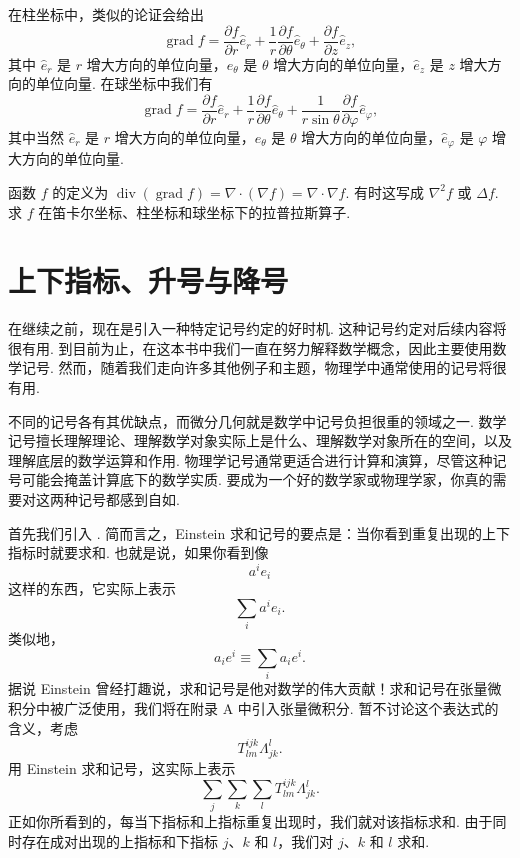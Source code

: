 在柱坐标中，类似的论证会给出
\[
\operatorname{grad}f=\frac{\partial f}{\partial r}\hat{e}_r+\frac{1}{r}\frac{\partial f}{\partial\theta}\hat{e}_\theta+\frac{\partial f}{\partial z}\hat{e}_z,
\]
其中 $\hat{e}_r$ 是 $r$ 增大方向的单位向量，$\hat{e}_\theta$ 是 $\theta$ 增大方向的单位向量，$\hat{e}_z$ 是 $z$ 增大方向的单位向量. 在球坐标中我们有
\[
\operatorname{grad}f=\frac{\partial f}{\partial r}\hat{e}_r+\frac{1}{r}\frac{\partial f}{\partial\theta}\hat{e}_\theta+\frac{1}{r\sin\theta}\frac{\partial f}{\partial\varphi}\hat{e}_\varphi,
\]
其中当然 $\hat{e}_r$ 是 $r$ 增大方向的单位向量，$\hat{e}_\theta$ 是 $\theta$ 增大方向的单位向量，$\hat{e}_\varphi$ 是 $\varphi$ 增大方向的单位向量.

\begin{question}\label{q:9-9}
函数 $f$ 的定义为 $\operatorname{div}(\operatorname{grad}f)=\nabla\cdot(\nabla f)=\nabla\cdot\nabla f$. 有时这写成 $\nabla^2f$ 或 $\Delta f$. 求 $f$ 在笛卡尔坐标、柱坐标和球坐标下的拉普拉斯算子.
\end{question}

\section{上下指标、升号与降号}

在继续之前，现在是引入一种特定记号约定的好时机. 这种记号约定对后续内容将很有用. 到目前为止，在这本书中我们一直在努力解释数学概念，因此主要使用数学记号. 然而，随着我们走向许多其他例子和主题，物理学中通常使用的记号将很有用.

不同的记号各有其优缺点，而微分几何就是数学中记号负担很重的领域之一. 数学记号擅长理解理论、理解数学对象实际上是什么、理解数学对象所在的空间，以及理解底层的数学运算和作用. 物理学记号通常更适合进行计算和演算，尽管这种记号可能会掩盖计算底下的数学实质. 要成为一个好的数学家或物理学家，你真的需要对这两种记号都感到自如.

首先我们引入 . 简而言之，Einstein 求和记号的要点是：当你看到重复出现的上下指标时就要求和. 也就是说，如果你看到像
\[
a^ie_i
\]
这样的东西，它实际上表示
\[
\sum_i a^ie_i.
\]
类似地，
\[
a_ie^i\equiv\sum_i a_ie^i.
\]
据说 Einstein 曾经打趣说，求和记号是他对数学的伟大贡献！求和记号在张量微积分中被广泛使用，我们将在附录 A 中引入张量微积分. 暂不讨论这个表达式的含义，考虑
\[
T^{ijk}_{lm}\Lambda^{l}_{jk}.
\]
用 Einstein 求和记号，这实际上表示
\[
\sum_j\sum_k\sum_l T^{ijk}_{lm}\Lambda^{l}_{jk}.
\]
正如你所看到的，每当下指标和上指标重复出现时，我们就对该指标求和. 由于同时存在成对出现的上指标和下指标 $j$、$k$ 和 $l$，我们对 $j$、$k$ 和 $l$ 求和.


